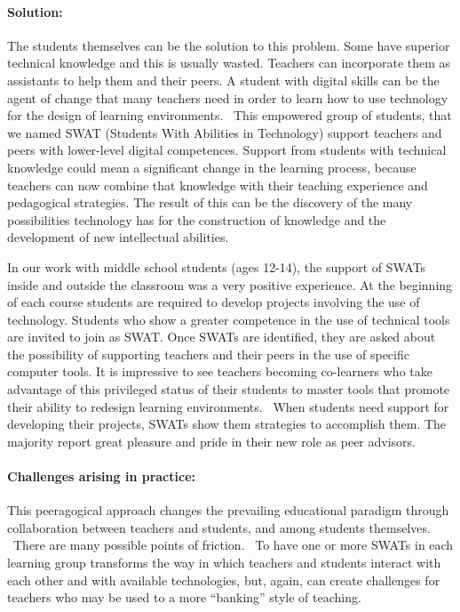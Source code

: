 \hypertarget{solution}{%
\paragraph{Solution:}\label{solution}}

The students themselves can be the solution to this problem. Some have
superior technical knowledge and this is usually wasted. Teachers can
incorporate them as assistants to help them and their peers. A student
with digital skills can be the agent of change that many teachers need
in order to learn how to use technology for the design of learning
environments. ~This empowered group of students, that we named SWAT
(Students With Abilities in Technology) support teachers and peers with
lower-level digital competences. Support from students with technical
knowledge could mean a significant change in the learning process,
because teachers can now combine that knowledge with their teaching
experience and pedagogical strategies. The result of this can be the
discovery of the many possibilities technology has for the construction
of knowledge and the development of new intellectual abilities.

In our work with middle school students (ages 12-14), the support of
SWATs inside and outside the classroom was a very positive experience.
At the beginning of each course students are required to develop
projects involving the use of technology. Students who show a greater
competence in the use of technical tools are invited to join as SWAT.
Once SWATs are identified, they are asked about the possibility of
supporting teachers and their peers in the use of specific computer
tools. It is impressive to see teachers becoming co-learners who take
advantage of this privileged status of their students to master tools
that promote their ability to redesign learning environments. ~When
students need support for developing their projects, SWATs show them
strategies to accomplish them. The majority report great pleasure and
pride in their new role as peer advisors.

\hypertarget{challenges-arising-in-practice}{%
\paragraph{Challenges arising in
practice:}\label{challenges-arising-in-practice}}

This peeragogical approach changes the prevailing educational paradigm
through collaboration between teachers and students, and among students
themselves. ~There are many possible points of friction. ~To have one or
more SWATs in each learning group transforms the way in which teachers
and students interact with each other and with available technologies,
but, again, can create challenges for teachers who may be used to a more
``banking'' style of teaching.

